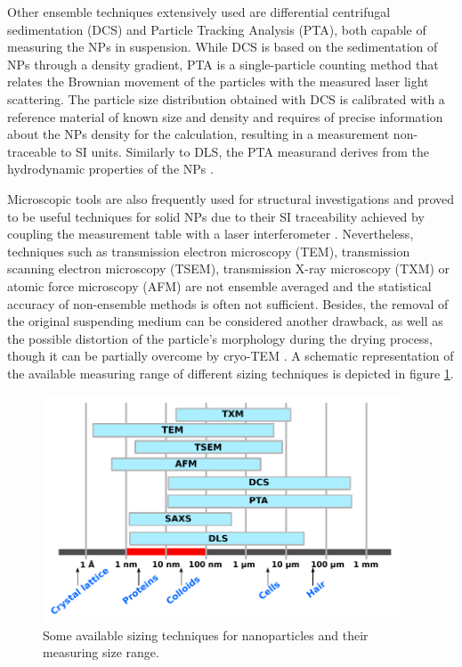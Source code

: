 Other ensemble techniques extensively used are differential centrifugal sedimentation (DCS) \citep{fielding_correcting_2012} and Particle Tracking Analysis (PTA), both capable of measuring the NPs in suspension. While DCS is based on the sedimentation of NPs through a density gradient, PTA is a single-particle counting method that relates the Brownian movement of the particles with the measured laser light scattering. The particle size distribution obtained with DCS is calibrated with a reference material of known size and density and requires of precise information about the NPs density for the calculation, resulting in a measurement non-traceable to SI units. Similarly to DLS, the PTA measurand derives from the hydrodynamic properties of the NPs \citep{varga_towards_2014}.

Microscopic tools are also frequently used for structural investigations \citep{joensson_morphology_1991,silverstein_microstructure_1989} and proved to be useful techniques for solid NPs due to their SI traceability achieved by coupling the measurement table with a laser interferometer \citep{meli_traceable_2012}. Nevertheless, techniques such as transmission electron microscopy (TEM), transmission scanning electron microscopy (TSEM), transmission X-ray microscopy (TXM) or atomic force microscopy (AFM) are not ensemble averaged and the statistical accuracy of non-ensemble methods is often not sufficient. Besides, the removal of the original suspending medium can be considered another drawback, as well as the possible distortion of the particle's morphology during the drying process, though it can be partially overcome by cryo-TEM \citep{li_doxorubicin_1998}. A schematic representation of the available measuring range of different sizing techniques is depicted in figure \ref{fig:SizeRange}.

\begin{figure}[hbt]%
	\centering
		\includegraphics[width=0.95\textwidth]{Figures/SizeRange.pdf}
		\caption[Sizing techniques.]{Some available sizing techniques for nanoparticles and their measuring size range.}
		\label{fig:SizeRange}
\end{figure}

